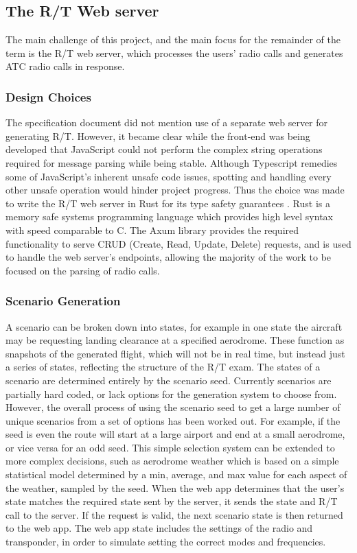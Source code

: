 \subsection{The R/T Web server}
The main challenge of this project, and the main focus for the remainder of the term is the R/T web server, which processes the users' radio calls and generates ATC radio calls in response.

\subsubsection{Design Choices}
The specification document did not mention use of a separate web server for generating R/T. However, it became clear while the front-end was being developed that JavaScript could not perform the complex string operations required for message parsing while being stable. Although Typescript remedies some of JavaScript's inherent unsafe code issues, spotting and handling every other unsafe operation would hinder project progress. Thus the choice was made to write the R/T web server in Rust for its type safety guarantees \cite{Rust}. Rust is a memory safe systems programming language which provides high level syntax with speed comparable to C. The Axum library \cite{Axum} provides the required functionality to serve CRUD (Create, Read, Update, Delete) requests, and is used to handle the web server's endpoints, allowing the majority of the work to be focused on the parsing of radio calls.

\subsubsection{Scenario Generation}
A scenario can be broken down into states, for example in one state the aircraft may be requesting landing clearance at a specified aerodrome. These function as snapshots of the generated flight, which will not be in real time, but instead just a series of states, reflecting the structure of the R/T exam. The states of a scenario are determined entirely by the scenario seed. Currently scenarios are partially hard coded, or lack options for the generation system to choose from. However, the overall process of using the scenario seed to get a large number of unique scenarios from a set of options has been worked out. For example, if the seed is even the route will start at a large airport and end at a small aerodrome, or vice versa for an odd seed. This simple selection system can be extended to more complex decisions, such as aerodrome weather which is based on a simple statistical model determined by a min, average, and max value for each aspect of the weather, sampled by the seed. When the web app determines that the user's state matches the required state sent by the server, it sends the state and R/T call to the server. If the request is valid, the next scenario state is then returned to the web app. The web app state includes the settings of the radio and transponder, in order to simulate setting the correct modes and frequencies.

